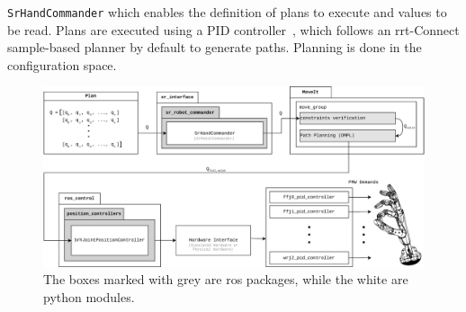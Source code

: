 \texttt{SrHandCommander} which enables the definition of plans to execute and values to be read.
Plans are executed using a PID controller~\cite{controlling-the-hand}, which follows an \gls{rrt}-Connect sample-based planner by default to generate paths. Planning is done in the configuration space.

\begin{figure}[h]
		\begin{center}
			\includegraphics[width=\textwidth]{chapters/system-setup/fig/hand-communication-architecture-crop.pdf}
		\end{center}
		\caption{The boxes marked with grey are \gls{ros} packages, while the white are python modules.}
		\label{fig:hand-communication-architecture}
\end{figure}


